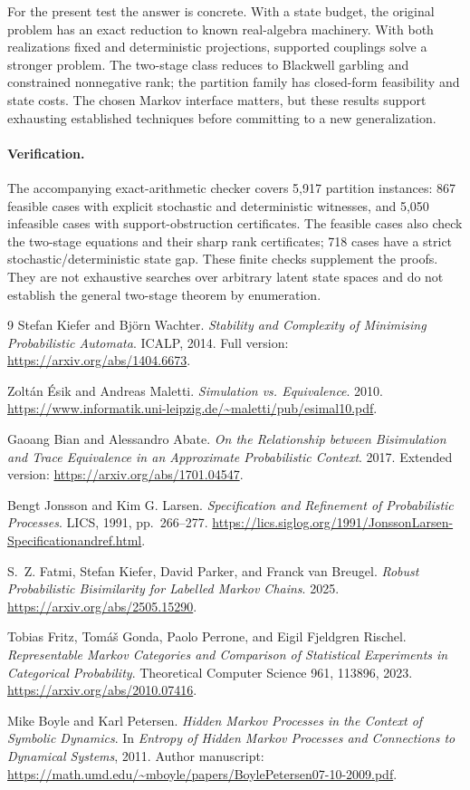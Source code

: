 \documentclass[11pt]{article}
\begin{document}
For the present test the answer is concrete. With a state budget, the original problem has an exact reduction to known real-algebra machinery. With both realizations fixed and deterministic projections, supported couplings solve a stronger problem. The two-stage class reduces to Blackwell garbling and constrained nonnegative rank; the partition family has closed-form feasibility and state costs. The chosen Markov interface matters, but these results support exhausting established techniques before committing to a new generalization.

\paragraph{Verification.}
The accompanying exact-arithmetic checker covers 5,917 partition instances: 867 feasible cases with explicit stochastic and deterministic witnesses, and 5,050 infeasible cases with support-obstruction certificates. The feasible cases also check the two-stage equations and their sharp rank certificates; 718 cases have a strict stochastic/deterministic state gap. These finite checks supplement the proofs. They are not exhaustive searches over arbitrary latent state spaces and do not establish the general two-stage theorem by enumeration.

\begin{thebibliography}{9}
Stefan Kiefer and Bj\"orn Wachter.
\emph{Stability and Complexity of Minimising Probabilistic Automata}.
ICALP, 2014. Full version: \url{https://arxiv.org/abs/1404.6673}.

Zolt\'an \'Esik and Andreas Maletti.
\emph{Simulation vs. Equivalence}. 2010.
\url{https://www.informatik.uni-leipzig.de/~maletti/pub/esimal10.pdf}.

Gaoang Bian and Alessandro Abate.
\emph{On the Relationship between Bisimulation and Trace Equivalence in an Approximate Probabilistic Context}. 2017. Extended version:
\url{https://arxiv.org/abs/1701.04547}.

Bengt Jonsson and Kim G. Larsen.
\emph{Specification and Refinement of Probabilistic Processes}.
LICS, 1991, pp.~266--277.
\url{https://lics.siglog.org/1991/JonssonLarsen-Specificationandref.html}.

S.~Z. Fatmi, Stefan Kiefer, David Parker, and Franck van Breugel.
\emph{Robust Probabilistic Bisimilarity for Labelled Markov Chains}. 2025.
\url{https://arxiv.org/abs/2505.15290}.

Tobias Fritz, Tom\'a\v{s} Gonda, Paolo Perrone, and Eigil Fjeldgren Rischel.
\emph{Representable Markov Categories and Comparison of Statistical Experiments in Categorical Probability}.
Theoretical Computer Science 961, 113896, 2023.
\url{https://arxiv.org/abs/2010.07416}.

Mike Boyle and Karl Petersen.
\emph{Hidden Markov Processes in the Context of Symbolic Dynamics}.
In \emph{Entropy of Hidden Markov Processes and Connections to Dynamical Systems}, 2011.
Author manuscript: \url{https://math.umd.edu/~mboyle/papers/BoylePetersen07-10-2009.pdf}.
\end{thebibliography}
\end{document}
